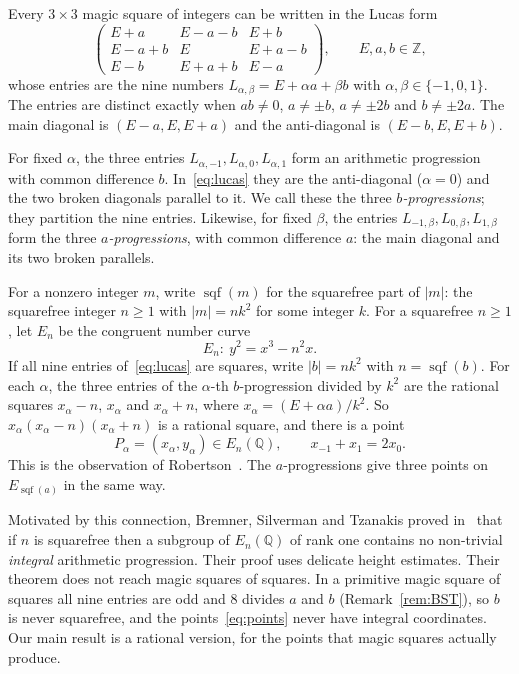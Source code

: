\documentclass[11pt]{amsart}
\theoremstyle{definition}
\theoremstyle{remark}
\newcommand{\Q}{\mathbb{Q}}
\newcommand{\Z}{\mathbb{Z}}
\DeclareMathOperator{\sqf}{sqf}
\begin{document}
Every $3\times3$ magic square of integers can be written in the Lucas form
\begin{equation}\label{eq:lucas}
\begin{pmatrix}
E+a & E-a-b & E+b\\
E-a+b & E & E+a-b\\
E-b & E+a+b & E-a
\end{pmatrix},
\qquad E,a,b\in\Z,
\end{equation}
whose entries are the nine numbers $L_{\alpha,\beta}=E+\alpha a+\beta b$ with
$\alpha,\beta\in\{-1,0,1\}$. The entries are distinct exactly when $ab\neq0$, $a\neq\pm b$,
$a\neq\pm2b$ and $b\neq\pm2a$. The main diagonal is $(E-a,E,E+a)$ and the anti-diagonal is
$(E-b,E,E+b)$.

For fixed $\alpha$, the three entries $L_{\alpha,-1},L_{\alpha,0},L_{\alpha,1}$ form an arithmetic
progression with common difference $b$. In~\eqref{eq:lucas} they are the anti-diagonal ($\alpha=0$) and
the two broken diagonals parallel to it. We call these the three \emph{$b$-progressions}; they partition
the nine entries. Likewise, for fixed $\beta$, the entries $L_{-1,\beta},L_{0,\beta},L_{1,\beta}$ form
the three \emph{$a$-progressions}, with common difference $a$: the main diagonal and its two broken
parallels.

For a nonzero integer $m$, write $\sqf(m)$ for the squarefree part of $|m|$: the squarefree integer
$n\ge1$ with $|m|=nk^2$ for some integer $k$. For a squarefree $n\ge1$, let $E_n$ be the congruent number
curve
\[
E_n\colon\ y^2=x^3-n^2x.
\]
If all nine entries of~\eqref{eq:lucas} are squares, write $|b|=nk^2$ with $n=\sqf(b)$. For each $\alpha$,
the three entries of the $\alpha$-th $b$-progression divided by $k^2$ are the rational squares $x_\alpha-n$,
$x_\alpha$ and $x_\alpha+n$, where $x_\alpha=(E+\alpha a)/k^2$. So $x_\alpha(x_\alpha-n)(x_\alpha+n)$ is a
rational square, and there is a point
\begin{equation}\label{eq:points}
P_\alpha=(x_\alpha,y_\alpha)\in E_n(\Q),\qquad x_{-1}+x_1=2x_0 .
\end{equation}
This is the observation of Robertson~\cite{Robertson}. The $a$-progressions give three points on
$E_{\sqf(a)}$ in the same way.

Motivated by this connection, Bremner, Silverman and Tzanakis proved in~\cite{BST} that if $n$ is
squarefree then a subgroup of $E_n(\Q)$ of rank one contains no non-trivial \emph{integral} arithmetic progression.
Their proof uses delicate height estimates. Their theorem does not reach magic squares of squares. In a
primitive magic square of squares all nine entries are odd and $8$ divides $a$ and $b$
(Remark~\ref{rem:BST}), so $b$ is never squarefree, and the points~\eqref{eq:points} never have integral
coordinates. Our main result is a rational version, for the points that magic squares actually produce.
\end{document}

